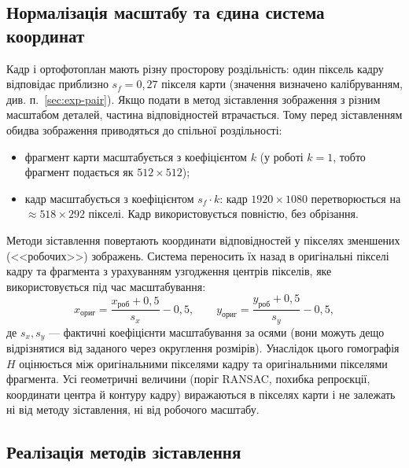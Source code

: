 \documentclass[a4paper, 12pt, titlepage]{article}
\begin{document}
\subsection{Нормалізація масштабу та єдина система координат}
\label{sec:scale}

Кадр і ортофотоплан мають різну просторову роздільність: один піксель кадру відповідає приблизно $s_f = 0{,}27$ пікселя карти (значення визначено калібруванням, див. п.~\ref{sec:exp-pair}). Якщо подати в метод зіставлення зображення з різним масштабом деталей, частина відповідностей втрачається. Тому перед зіставленням обидва зображення приводяться до спільної роздільності:
\begin{itemize}
    \item фрагмент карти масштабується з коефіцієнтом $k$ (у роботі $k = 1$, тобто фрагмент подається як $512 \times 512$);
    \item кадр масштабується з коефіцієнтом $s_f \cdot k$: кадр $1920 \times 1080$ перетворюється на $\approx 518 \times 292$ пікселі. Кадр використовується повністю, без обрізання.
\end{itemize}

Методи зіставлення повертають координати відповідностей у пікселях зменшених (<<робочих>>) зображень. Система переносить їх назад в оригінальні пікселі кадру та фрагмента з урахуванням узгодження центрів пікселів, яке використовується під час масштабування:
\begin{equation}
x_{\text{ориг}} = \frac{x_{\text{роб}} + 0{,}5}{s_x} - 0{,}5, \qquad
y_{\text{ориг}} = \frac{y_{\text{роб}} + 0{,}5}{s_y} - 0{,}5,
\label{eq:backmap}
\end{equation}
де $s_x, s_y$ --- фактичні коефіцієнти масштабування за осями (вони можуть дещо відрізнятися від заданого через округлення розмірів). Унаслідок цього гомографія $H$ оцінюється між оригінальними пікселями кадру та оригінальними пікселями фрагмента. Усі геометричні величини (поріг RANSAC, похибка репроєкції, координати центра й контуру кадру) виражаються в пікселях карти і не залежать ні від методу зіставлення, ні від робочого масштабу.

\subsection{Реалізація методів зіставлення}
\end{document}
